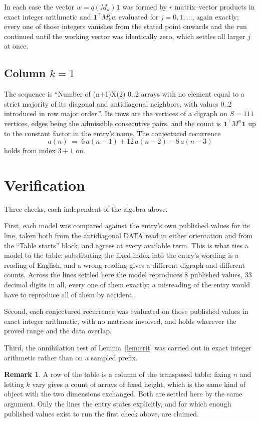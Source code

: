 \documentclass[11pt,a4paper]{article}
\theoremstyle{plain}
\theoremstyle{definition}
\newtheorem{remark}[theorem]{Remark}
\begin{document}
In each case the vector $w=q(M_k)\mathbf{1}$ was formed by $r$ matrix--vector products in
exact integer arithmetic and $\mathbf{1}^{\!\top}M_k^{j}w$ evaluated for $j=0,1,\dots$,
again exactly; every one of those integers vanishes from the stated point onwards and the run
continued until the working vector was identically zero, which settles all larger $j$ at once.

\subsection*{Column $k$$=1$}
The sequence is ``Number of (n+1)X(2) 0..2 arrays with no element equal to a strict majority of its diagonal and antidiagonal neighbors, with values 0..2 introduced in row major order.''. Its rows are the vertices of a digraph on
$S=111$ vertices, edges being the admissible consecutive pairs, and the count is
$\mathbf{1}^{\!\top}M^{n}\mathbf{1}$ up to the constant factor in the entry's name.
The conjectured recurrence
\[
a(n)\;=\;6\,a(n-1) + 12\,a(n-2) - 8\,a(n-3)
\]
holds from index $3+1$ on.

\section{Verification}

Three checks, each independent of the algebra above.

First, each model was compared against the entry's own published values for its line, taken
both from the antidiagonal DATA read in either orientation and from the ``Table starts''
block, and agrees at every available term. This is what ties a model to the table:
substituting the fixed index into the entry's wording is a reading of English, and a wrong
reading gives a different digraph and different counts. Across the lines settled here the
model reproduces $8$ published values, $33$ decimal digits in all, every one of
them exactly; a misreading of the entry would have to reproduce all of them by accident.

Second, each conjectured recurrence was evaluated on those published values in exact
integer arithmetic, with no matrices involved, and holds wherever the proved range and the
data overlap.

Third, the annihilation test of Lemma~\ref{lem:crit} was carried out in exact integer
arithmetic rather than on a sampled prefix.

\begin{remark}
A row of the table is a column of the transposed table: fixing $n$ and letting $k$ vary gives a
count of arrays of fixed height, which is the same kind of object with the two dimensions
exchanged. Both are settled here by the same argument. Only the lines the entry states
explicitly, and for which enough published values exist to run the first check above, are
claimed.
\end{remark}
\end{document}
